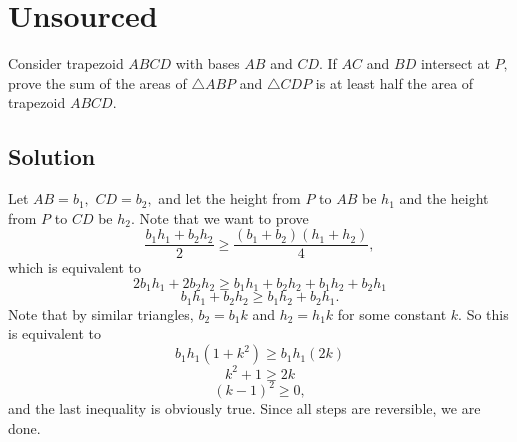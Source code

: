 \documentclass{article}
\begin{document}
\pagebreak\section{Unsourced}
Consider trapezoid $ABCD$ with bases $AB$ and $CD.$ If $AC$ and $BD$ intersect at $P,$ prove the sum of the areas of $\triangle ABP$ and $\triangle CDP$ is at least half the area of trapezoid $ABCD.$

\subsection{Solution}

Let $AB=b_1,$ $CD=b_2,$ and let the height from $P$ to $AB$ be $h_1$ and the height from $P$ to $CD$ be $h_2.$ Note that we want to prove
\[\frac{b_1h_1+b_2h_2}{2}\geq \frac{(b_1+b_2)(h_1+h_2)}{4},\]
which is equivalent to
\[2b_1h_1+2b_2h_2\geq b_1h_1+b_2h_2+b_1h_2+b_2h_1\]
\[b_1h_1+b_2h_2\geq b_1h_2+b_2h_1.\]
Note that by similar triangles, $b_2=b_1k$ and $h_2=h_1k$ for some constant $k.$ So this is equivalent to
\[b_1h_1(1+k^2)\geq b_1h_1(2k)\]
\[k^2+1\geq 2k\]
\[(k-1)^2\geq 0,\]
and the last inequality is obviously true. Since all steps are reversible, we are done.

\begin{center}
\end{center}
\end{document}
